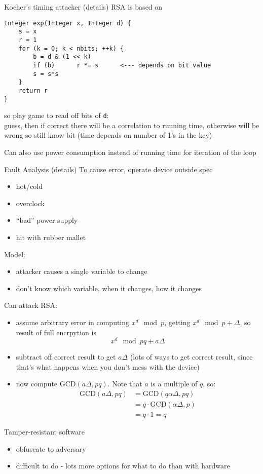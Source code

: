 \begin{subsektion}{Kocher's timing attacker (details)}
RSA is based on
\begin{verbatim}
Integer exp(Integer x, Integer d) {
    s = x
    r = 1
    for (k = 0; k < nbits; ++k) {
        b = d & (1 << k)
        if (b)      r *= s      <--- depends on bit value
        s = s*s
    }
    return r
}
\end{verbatim}
so play game to read off bits of \texttt{d}:\\
        guess, then if correct there will be a correlation to running time,
        otherwise will be wrong so still know bit (time depends on number of 1's
        in the key)

Can also use power consumption instead of running time for iteration of the loop
\end{subsektion}
\begin{subsektion}{Fault Analysis (details)}
To cause error, operate device outside spec
\begin{itemize}
    \item hot/cold
    \item overclock
    \item ``bad'' power supply
    \item hit with rubber mallet
\end{itemize}
Model:
\begin{itemize}
    \item attacker causes a single variable to change
    \item don't know which variable, when it changes, how it changes
\end{itemize}
Can attack RSA:

\begin{itemize}
    \item assume arbitrary error in computing $x^d \mod p$, getting
            $x^d \mod p + \Delta$, so result of full encrpytion is
            $$x^d \mod pq + a\Delta$$
    \item subtract off correct result to get $a\Delta$ (lots of ways to get
            correct result, since that's what happens when you don't mess with
            the device)
    \item now compute $\text{GCD}(a\Delta, pq)$. Note that $a$ is a multiple of
            $q$, so:
            \begin{align*}
            \text{GCD}(a\Delta, pq)&=\text{GCD}(q\alpha\Delta, pq)\\
              &=q\cdot\text{GCD}(\alpha\Delta,p)\\
              &=q\cdot1 = q
            \end{align*}
\end{itemize}
\end{subsektion}
\begin{subsektion}{Tamper-resistant software}
\begin{itemize}
    \item obfuscate to adversary
    \item difficult to do - lots more options for what to do than with hardware
\end{itemize}
\end{subsektion}
